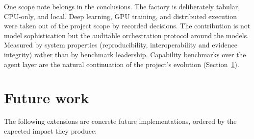 One scope note belongs in the conclusions. The factory is deliberately tabular, CPU-only, and local. Deep learning, GPU training, and distributed execution were taken out of the project scope by recorded decisions. The contribution is not model sophistication but the auditable orchestration protocol around the models. Measured by system properties (reproducibility, interoperability and evidence integrity) rather than by benchmark leadership. Capability benchmarks over the agent layer are the natural continuation of the project's evolution (Section~\ref{sec:futurework}).


\section{Future work}
\label{sec:futurework}

The following extensions are concrete future implementations, ordered by the expected impact they produce:

